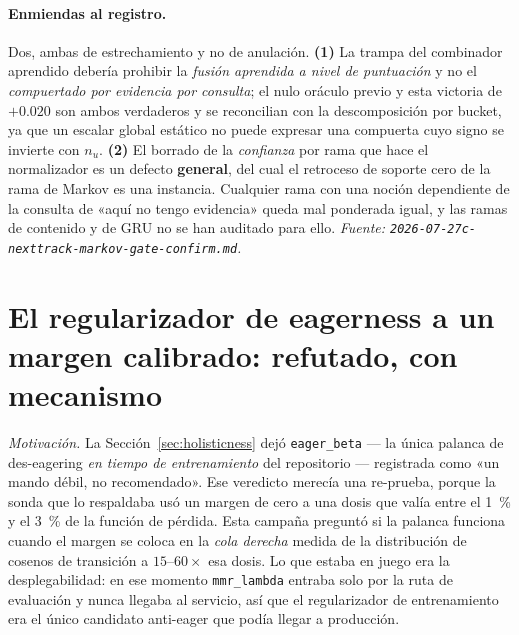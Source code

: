 \documentclass[11pt]{article}
\begin{document}
\paragraph{Enmiendas al registro.} Dos, ambas de estrechamiento y no de
anulación. \textbf{(1)} La trampa del combinador aprendido debería prohibir la
\emph{fusión aprendida a nivel de puntuación} y no el \emph{compuertado por
evidencia por consulta}; el nulo oráculo previo y esta victoria de
$+\num{0.020}$ son ambos verdaderos y se reconcilian con la descomposición por
bucket, ya que un escalar global estático no puede expresar una compuerta cuyo
signo se invierte con $n_u$. \textbf{(2)} El borrado de la \emph{confianza} por
rama que hace el normalizador es un defecto \textbf{general}, del cual el retroceso
de soporte cero de la rama de Markov es una instancia. Cualquier rama con una
noción dependiente de la consulta de «aquí no tengo evidencia» queda mal ponderada
igual, y las ramas de contenido y de GRU no se han auditado para ello.
\emph{Fuente: \texttt{2026-07-27c-nexttrack-markov-gate-confirm.md}.}

\section{El regularizador de eagerness a un margen calibrado: refutado, con mecanismo}
\label{sec:eagermargin}
\emph{Motivación.} La Sección~\ref{sec:holisticness} dejó \texttt{eager\_beta}
--- la única palanca de des-eagering \emph{en tiempo de entrenamiento} del
repositorio --- registrada como «un mando débil, no recomendado». Ese veredicto
merecía una re-prueba, porque la sonda que lo respaldaba usó un margen de cero a una
dosis que valía entre el \SI{1}{\percent} y el \SI{3}{\percent} de la función de
pérdida. Esta campaña preguntó si la palanca funciona cuando el margen se coloca en
la \emph{cola derecha} medida de la distribución de cosenos de transición a
$\numrange{15}{60}\times$ esa dosis. Lo que estaba en juego era la
desplegabilidad: en ese momento \texttt{mmr\_lambda} entraba solo por la ruta de
evaluación y nunca llegaba al servicio, así que el regularizador de entrenamiento
era el único candidato anti-eager que podía llegar a producción.
\end{document}
